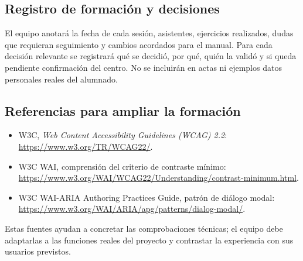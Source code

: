 \subsection{Registro de formación y decisiones}
El equipo anotará la fecha de cada sesión, asistentes, ejercicios realizados, dudas que requieran seguimiento y cambios acordados para el manual. Para cada decisión relevante se registrará qué se decidió, por qué, quién la validó y si queda pendiente confirmación del centro. No se incluirán en actas ni ejemplos datos personales reales del alumnado.

\subsection{Referencias para ampliar la formación}
\begin{itemize}[leftmargin=*]
  \item W3C, \textit{Web Content Accessibility Guidelines (WCAG) 2.2}: \url{https://www.w3.org/TR/WCAG22/}.
  \item W3C WAI, comprensión del criterio de contraste mínimo: \url{https://www.w3.org/WAI/WCAG22/Understanding/contrast-minimum.html}.
  \item W3C WAI-ARIA Authoring Practices Guide, patrón de diálogo modal: \url{https://www.w3.org/WAI/ARIA/apg/patterns/dialog-modal/}.
\end{itemize}

Estas fuentes ayudan a concretar las comprobaciones técnicas; el equipo debe adaptarlas a las funciones reales del proyecto y contrastar la experiencia con sus usuarios previstos.